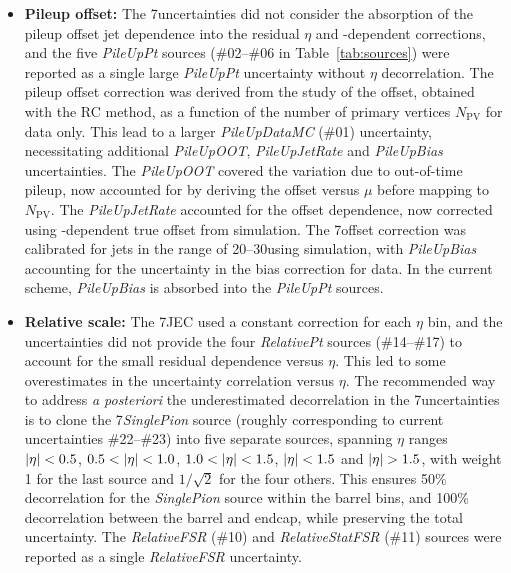\documentclass[11pt,twoside,a4paper,cmspaper,final,collab]{cms-tdr}
\begin{document}
\begin{itemize}
\item \textbf{Pileup offset:} The 7\TeV uncertainties did not consider the absorption of the pileup offset jet \pt dependence into the residual $\eta$ and \pt-dependent corrections, and the five \textit{PileUpPt} sources (\#02--\#06 in Table~\ref{tab:sources}) were reported as a single large \textit{PileUpPt} uncertainty without $\eta$ decorrelation.
The pileup offset correction was derived from the study of the offset, obtained with the RC method, as a function of the number of primary vertices $N_\mathrm{PV}$ for data only. This lead to a larger \textit{PileUpDataMC} (\#01) uncertainty, necessitating additional \textit{PileUpOOT}, \textit{PileUpJetRate} and \textit{PileUpBias} uncertainties. The \textit{PileUpOOT} covered the variation due to out-of-time pileup, now accounted for by deriving the offset versus $\mu$ before mapping to $N_\mathrm{PV}$. The \textit{ PileUpJetRate} accounted for the offset \pt dependence, now corrected using \pt-dependent true offset from simulation. The 7\TeV offset correction was calibrated for jets in the \pt range of 20--30\GeV using simulation, with \textit{PileUpBias} accounting for the uncertainty in the bias correction for data. In the current scheme, \textit{PileUpBias} is absorbed into the \textit{PileUpPt} sources.

\item \textbf{Relative scale:} The 7\TeV JEC used a constant correction for each $\eta$ bin, and the uncertainties did not provide the four \textit{RelativePt} sources (\#14--\#17) to account for the small residual \pt dependence versus $\eta$. This led to some overestimates in the uncertainty correlation versus $\eta$. The recommended way to address \textit{a posteriori} the underestimated decorrelation in the 7\TeV uncertainties is to clone the 7\TeV \textit{SinglePion} source (roughly corresponding to current uncertainties \#22--\#23) into five separate sources, spanning $\eta$ ranges $\lvert \eta \rvert<0.5$, $0.5<\lvert \eta \rvert<1.0$, $1.0<\lvert \eta \rvert<1.5$, $\lvert \eta \rvert<1.5$ and $\lvert \eta \rvert>1.5$, with weight 1 for the last source and $1/\sqrt{2}$ for the four others. This ensures 50\% decorrelation for the \textit{SinglePion} source within the barrel bins, and 100\% decorrelation between the barrel and endcap, while preserving the total uncertainty. The \textit{RelativeFSR} (\#10) and \textit{RelativeStatFSR} (\#11) sources were reported as a single \textit{RelativeFSR} uncertainty.


\end{itemize}
\end{document}
